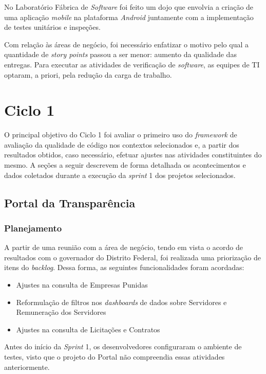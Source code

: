 No Laboratório Fábrica de \textit{Software} foi feito um dojo que envolvia a criação de uma aplicação \textit{mobile} na plataforma \textit{Android} juntamente com a implementação de testes unitários e inspeções.

Com relação às áreas de negócio, foi necessário enfatizar o motivo pelo qual a quantidade de \textit{story points} passou a ser menor: aumento da qualidade das entregas. Para executar as atividades de verificação de \textit{software}, as equipes de TI optaram, a priori, pela redução da carga de trabalho.

\section{Ciclo 1}

O principal objetivo do Ciclo 1 foi avaliar o primeiro uso do \textit{framework} de avaliação da qualidade de código nos contextos selecionados e, a partir dos resultados obtidos, caso necessário, efetuar ajustes nas atividades constituintes do mesmo. A seções a seguir descrevem de forma detalhada os acontecimentos e dados coletados durante a execução da \textit{sprint} 1 dos projetos selecionados.

\subsection{Portal da Transparência}

\subsubsection{Planejamento}

A partir de uma reunião com a área de negócio, tendo em vista o acordo de resultados com o governador do Distrito Federal, foi realizada uma priorização de itens do \textit{backlog}. Dessa forma, as seguintes funcionalidades foram acordadas:

\begin{itemize}
	\item Ajustes na consulta de Empresas Punidas
	\item Reformulação de filtros nos \textit{dashboards} de dados sobre Servidores e Remuneração dos Servidores
	\item Ajustes na consulta de Licitações e Contratos
\end{itemize}

Antes do início da \textit{Sprint} 1, os desenvolvedores configuraram o ambiente de testes, visto que o projeto do Portal não compreendia essas atividades anteriormente.

